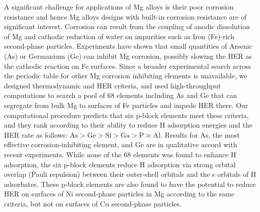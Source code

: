 A significant challenge for applications of Mg alloys is their poor corrosion resistance and hence Mg alloys designs with built-in corrosion resistance are of significant interest. Corrosion can result from the coupling of anodic dissolution of Mg and cathodic reduction of water on impurities such as Iron (Fe)-rich second-phase particles. Experiments have shown that small quantities of Arsenic (As) or Germanium (Ge) can inhibit Mg corrosion, possibly slowing the \ac{HER} as the cathodic reaction on Fe surfaces. Since a broader experimental search across the periodic table for other Mg corrosion inhibiting elements is unavailable, we designed thermodynamic and \ac{HER} criteria, and used high-throughput computations to search a pool of 68 elements including As and Ge that can segregate from bulk Mg to surfaces of Fe particles and impede \ac{HER} there. Our computational procedure predicts that six p-block elements meet these criteria, and they rank according to their ability to reduce H adsorption energies and the \ac{HER} rate as follows: $\text{As} > \text{Ge} > \text{Si} > \text{Ga} > \text{P} \approx \text{Al}$. Results for As, the most effective corrosion-inhibiting element, and Ge are in qualitative accord with recent experiments. While none of the 68 elements was found to enhance H adsorption, the six p-block elements reduce H adsorption via strong orbital overlap (Pauli repulsion) between their outer-shell orbitals and the s orbitals of H adsorbates. These p-block elements are also found to have the potential to reduce \ac{HER} on surfaces of Ni second-phase particles in Mg according to the same criteria, but not on surfaces of Cu second-phase particles. 

